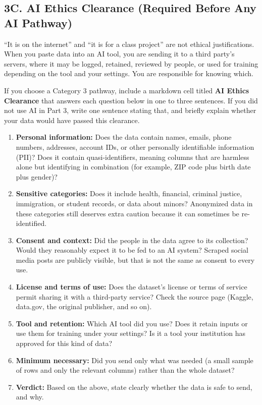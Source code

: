 \documentclass[11pt,letterpaper]{article}
\begin{document}
\subsection{3C. AI Ethics Clearance (Required Before Any AI Pathway)}

``It is on the internet'' and ``it is for a class project'' are not ethical justifications. When you paste data into an AI tool, you are sending it to a third party's servers, where it may be logged, retained, reviewed by people, or used for training depending on the tool and your settings. You are responsible for knowing which.

If you choose a Category 3 pathway, include a markdown cell titled \textbf{AI Ethics Clearance} that answers each question below in one to three sentences. If you did not use AI in Part 3, write one sentence stating that, and briefly explain whether your data would have passed this clearance.
\begin{enumerate}
  \item \textbf{Personal information:} Does the data contain names, emails, phone numbers, addresses, account IDs, or other personally identifiable information (PII)? Does it contain quasi-identifiers, meaning columns that are harmless alone but identifying in combination (for example, ZIP code plus birth date plus gender)?
  \item \textbf{Sensitive categories:} Does it include health, financial, criminal justice, immigration, or student records, or data about minors? Anonymized data in these categories still deserves extra caution because it can sometimes be re-identified.
  \item \textbf{Consent and context:} Did the people in the data agree to its collection? Would they reasonably expect it to be fed to an AI system? Scraped social media posts are publicly visible, but that is not the same as consent to every use.
  \item \textbf{License and terms of use:} Does the dataset's license or terms of service permit sharing it with a third-party service? Check the source page (Kaggle, data.gov, the original publisher, and so on).
  \item \textbf{Tool and retention:} Which AI tool did you use? Does it retain inputs or use them for training under your settings? Is it a tool your institution has approved for this kind of data?
  \item \textbf{Minimum necessary:} Did you send only what was needed (a small sample of rows and only the relevant columns) rather than the whole dataset?
  \item \textbf{Verdict:} Based on the above, state clearly whether the data is safe to send, and why.
\end{enumerate}
\end{document}

